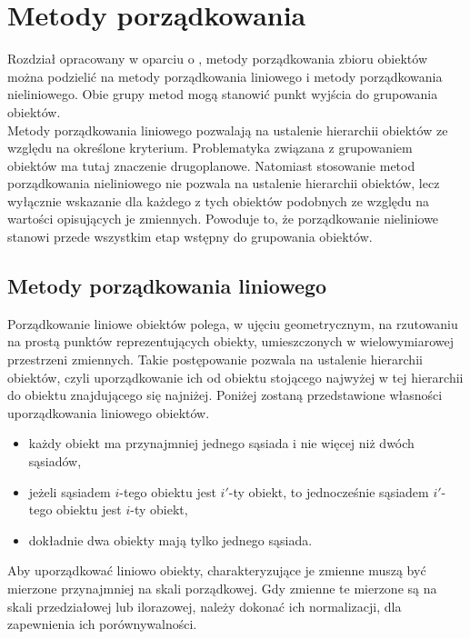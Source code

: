 \documentclass[12pt,a4paper]{report}
\begin{document}
\chapter{Metody porządkowania}

Rozdział opracowany w oparciu o \cite[Rozdział 2]{panek2013}, metody porządkowania zbioru obiektów można podzielić na metody porządkowania liniowego i metody porządkowania nieliniowego. Obie grupy metod mogą stanowić punkt wyjścia do grupowania obiektów. \\
Metody porządkowania liniowego pozwalają na ustalenie hierarchii obiektów ze względu na określone kryterium. Problematyka związana z grupowaniem obiektów ma tutaj znaczenie drugoplanowe. Natomiast stosowanie metod porządkowania nieliniowego nie pozwala na ustalenie hierarchii obiektów, lecz wyłącznie wskazanie dla każdego z tych obiektów podobnych ze względu na wartości opisujących je zmiennych. Powoduje to, że porządkowanie nieliniowe stanowi przede wszystkim etap wstępny do grupowania obiektów.\\

\section{Metody porządkowania liniowego}

Porządkowanie liniowe obiektów polega, w ujęciu geometrycznym, na rzutowaniu na prostą punktów reprezentujących obiekty, umieszczonych w wielowymiarowej przestrzeni zmiennych. Takie postępowanie pozwala na ustalenie hierarchii obiektów, czyli uporządkowanie ich od obiektu stojącego najwyżej w tej hierarchii do obiektu znajdującego się najniżej. Poniżej zostaną przedstawione własności uporządkowania liniowego obiektów.\\

\begin{itemize}
\item każdy obiekt ma przynajmniej jednego sąsiada i nie więcej niż dwóch sąsiadów,
\item jeżeli sąsiadem $i$-tego obiektu jest $i'$-ty obiekt, to jednocześnie sąsiadem $i'$-tego obiektu jest $i$-ty obiekt,
\item dokładnie dwa obiekty mają tylko jednego sąsiada.\\
\end{itemize}
\noindent

Aby uporządkować liniowo obiekty, charakteryzujące je zmienne muszą być mierzone przynajmniej na skali porządkowej. Gdy zmienne te mierzone są na skali przedziałowej lub ilorazowej, należy dokonać ich normalizacji, dla zapewnienia ich porównywalności.
\end{document}
